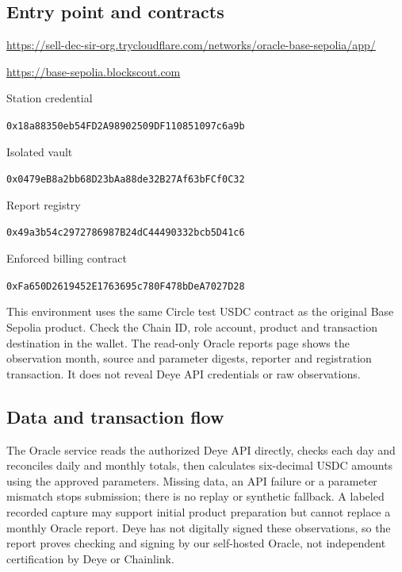 \documentclass[12pt,a4paper]{article}
\begin{document}
\subsection{Entry point and contracts}
\url{https://sell-dec-sir-org.trycloudflare.com/networks/oracle-base-sepolia/app/}\par
\url{https://base-sepolia.blockscout.com}\par
Station credential\par\nolinkurl{0x18a88350eb54FD2A98902509DF110851097c6a9b}\par\smallskip
Isolated vault\par\nolinkurl{0x0479eB8a2bb68D23bAa88de32B27Af63bFCf0C32}\par\smallskip
Report registry\par\nolinkurl{0x49a3b54c2972786987B24dC44490332bcb5D41c6}\par\smallskip
Enforced billing contract\par\nolinkurl{0xFa650D2619452E1763695c780F478bDeA7027D28}\par\smallskip
This environment uses the same Circle test USDC contract as the original Base Sepolia product. Check the Chain ID, role account, product and transaction destination in the wallet. The read-only Oracle reports page shows the observation month, source and parameter digests, reporter and registration transaction. It does not reveal Deye API credentials or raw observations.

\subsection{Data and transaction flow}
\begin{center}\end{center}
The Oracle service reads the authorized Deye API directly, checks each day and reconciles daily and monthly totals, then calculates six-decimal USDC amounts using the approved parameters. Missing data, an API failure or a parameter mismatch stops submission; there is no replay or synthetic fallback. A labeled recorded capture may support initial product preparation but cannot replace a monthly Oracle report. Deye has not digitally signed these observations, so the report proves checking and signing by our self-hosted Oracle, not independent certification by Deye or Chainlink.
\end{document}
